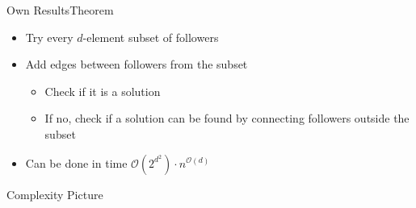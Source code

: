 \begin{frame}{Own Results}{Theorem}
    \begin{center}
    \end{center}

    \begin{itemize}
        \item Try every $d$-element subset of followers
        \item Add edges between followers from the subset
        \begin{itemize}
            \item Check if it is a solution
            \item If no, check if a solution can be found by connecting followers outside the subset 
        \end{itemize}
        \item Can be done in time $\mathcal{O}(2^{d^2}) \cdot n^{\mathcal{O}(d)}$
    \end{itemize}
\end{frame}

\begin{frame}{\HLdeg Complexity Picture}
    
\end{frame}
